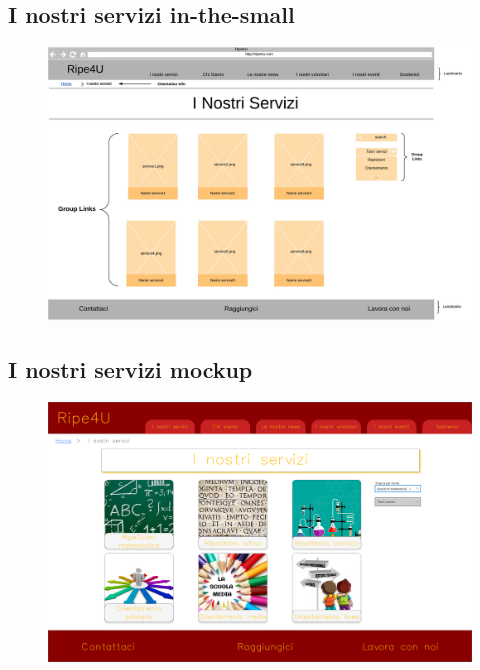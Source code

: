         \subsection{I nostri servizi in-the-small} 
        \begin{figure}[H]
            \centering
            \includegraphics[scale=0.42]{resources/images/iNostriServizi-in-the-small.jpg}
        \end{figure}

        \subsection{I nostri servizi mockup}
        \begin{figure}[H]
            \centering
            \includegraphics[scale=0.18]{resources/images/iNostriServizi-mockup.png}
        \end{figure}
    
    \newpage    
